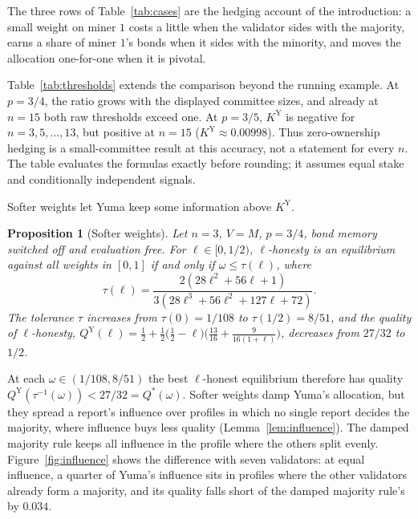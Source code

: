 \documentclass[sigconf,anonymous,review]{acmart}
\numberwithin{equation}{section}
\newtheorem{proposition}[theorem]{Proposition}
\newcommand{\KY}{K^{\mathrm{Y}}}
\newcommand{\QY}{Q^{\mathrm{Y}}}
\begin{document}
The three rows of Table~\ref{tab:cases} are the hedging account of the
introduction: a small weight on miner $1$ costs a little when the validator
sides with the majority, earns a share of miner $1$'s bonds when it sides with
the minority, and moves the allocation one-for-one when it is pivotal.

\begin{table}[t]
\caption{Raw threshold ratios $\KY/K$ from the closed forms, with $V=M$,
free evaluation and bond memory off. Negative values mean that a small
hedge pays at zero ownership. A dagger marks $K,\KY\ge1$: both then support
fully decisive reports throughout the feasible ownership range $[0,1]$.}
\label{tab:thresholds}
\centering
\small

\end{table}

Table~\ref{tab:thresholds} extends the comparison beyond the running example.
At $p=3/4$, the ratio grows with the displayed committee sizes, and already
at $n=15$ both raw thresholds exceed one. At $p=3/5$, $\KY$ is negative
for $n=3,5,\ldots,13$, but positive at $n=15$ ($\KY\approx0.00998$).
Thus zero-ownership hedging is a small-committee result at this accuracy,
not a statement for every $n$. The table evaluates the formulas exactly
before rounding; it assumes equal stake and conditionally independent signals.

Softer weights let Yuma keep some information above $\KY$.

\begin{proposition}[Softer weights]\label{prop:soft}
Let $n=3$, $V=M$, $p=3/4$, bond memory switched off and evaluation free. For
$\ell\in[0,1/2)$, $\ell$-honesty is an equilibrium against all weights in
$[0,1]$ if and only if $\omega\le\tau(\ell)$, where
\[
\tau(\ell)=\frac{2(28\ell^2+56\ell+1)}{3(28\ell^3+56\ell^2+127\ell+72)} .
\]
The tolerance $\tau$ increases from $\tau(0)=1/108$ to $\tau(1/2)=8/51$, and the
quality of $\ell$-honesty,
$\QY(\ell)=\frac12+\frac12\bigl(\frac12-\ell\bigr)\bigl(\frac{13}{16}+\frac{9}{16(1+\ell)}\bigr)$,
decreases from $27/32$ to $1/2$.
\end{proposition}

At each $\omega\in(1/108,8/51)$ the best $\ell$-honest equilibrium therefore has
quality $\QY(\tau^{-1}(\omega))<27/32=Q^*(\omega)$. Softer weights damp Yuma's
allocation, but they spread a report's influence over profiles in which no
single report decides the majority, where influence buys less quality
(Lemma~\ref{lem:influence}). The damped majority rule keeps all influence in the
profile where the others split evenly. Figure~\ref{fig:influence} shows the
difference with seven validators: at equal influence, a quarter of Yuma's
influence sits in profiles where the other validators already form a majority,
and its quality falls short of the damped majority rule's by $0.034$.
\end{document}
